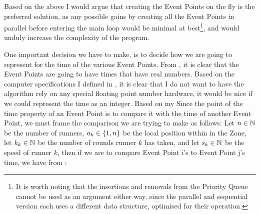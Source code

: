
Based on the above I would argue that creating the Event Points on the fly is the preferred solution, as any possible gains by creating all the Event Points in parallel before entering the main loop would be minimal at best\footnote{It is worth noting that the insertions and removals from the Priority Queue cannot be used as an argument either way, since the parallel and sequential version each uses a different data structure, optimised for their operation.}, and would unduly increase the complexity of the program. 

One important decision we have to make, is to decide how we are going to represent for the time of the various Event Points. From , it is clear that the Event Points are going to have times that have real numbers. Based on the computer specifications I defined in , it is clear that I do not want to have the algorithm rely on any special floating point number hardware, it would be nice if we could represent the time as an integer. Based on my Since the point of the time property of an Event Point is to compare it with the time of another Event Point, we must frame the comparison we are trying to make as follows: Let $n \in \mathbb{N}$ be the number of runners, $a_k \in \{1, n\}$ be the local position within in the Zone, let $k_k \in \mathbb{N}$ be the number of rounds runner $k$ has taken, and let $s_k \in \mathbb{N}$ be the speed of runner $k$, then if we are to compare Event Point i's to Event Point j's time, we have from :
  

